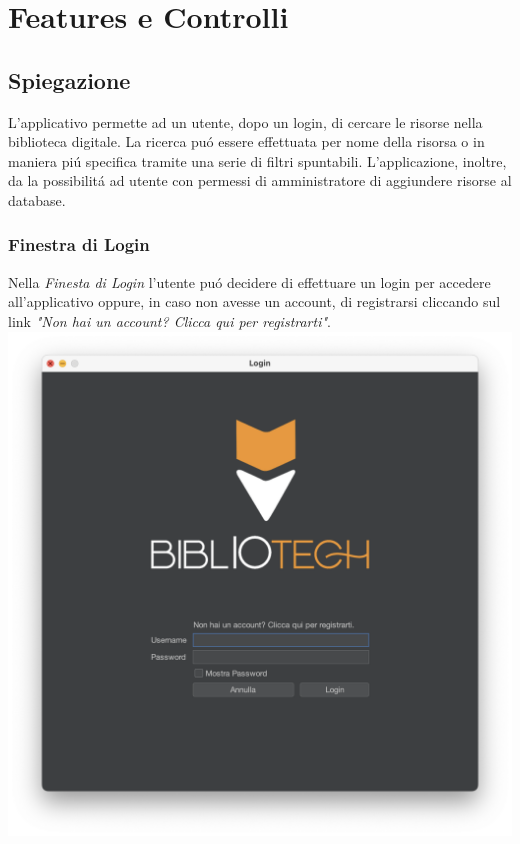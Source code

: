 \chapter{Features e Controlli}
 \section{Spiegazione}
 L'applicativo permette ad un utente, dopo un login, di cercare le risorse nella biblioteca digitale.
 La ricerca pu\'o essere effettuata per nome della risorsa o in maniera pi\'u specifica tramite una serie di
 filtri spuntabili.
 L'applicazione, inoltre, da la possibilit\'a ad utente con permessi di amministratore di aggiundere risorse 
 al database.


 \subsection{Finestra di Login}
 Nella \textit{Finesta di Login} l'utente pu\'o decidere di effettuare un login per accedere all'applicativo oppure,
 in caso non avesse un account, di registrarsi cliccando sul link \textit{"Non hai un account? Clicca
 qui per registrarti"}.
 \\
 \includegraphics[scale=0.25, center]{Immagini/Schermate/Login_Register/LoginPage.png}

